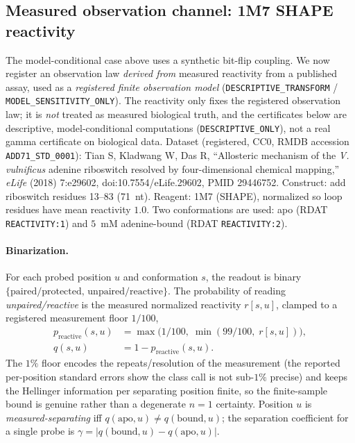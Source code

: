 \documentclass[11pt]{article}
\begin{document}
\subsection{Measured observation channel: 1M7 SHAPE reactivity}\label{sec:supp-measured}
The model-conditional case above uses a synthetic bit-flip coupling. We now register an observation law
\emph{derived from} measured reactivity from a published assay, used as a \emph{registered finite
observation model} (\texttt{DESCRIPTIVE\_TRANSFORM} / \texttt{MODEL\_SENSITIVITY\_ONLY}). The reactivity
only fixes the registered observation law; it is \emph{not} treated as measured biological truth, and the
certificates below are descriptive, model-conditional computations (\texttt{DESCRIPTIVE\_ONLY}), not a
real gamma certificate on biological data. Dataset (registered, CC0, RMDB accession
\texttt{ADD71\_STD\_0001}): Tian S, Kladwang W, Das R, ``Allosteric mechanism of the \emph{V.}
\emph{vulnificus} adenine riboswitch resolved by four-dimensional chemical mapping,'' \emph{eLife}
(2018) 7:e29602, doi:10.7554/eLife.29602, PMID 29446752. Construct: add riboswitch residues 13--83
(71~nt). Reagent: 1M7 (SHAPE), normalized so loop residues have mean reactivity $1.0$. Two conformations
are used: apo (RDAT \texttt{REACTIVITY:1}) and $5$~mM adenine-bound (RDAT \texttt{REACTIVITY:2}).

\paragraph{Binarization.}
For each probed position $u$ and conformation $s$, the readout is binary
$\{\text{paired/protected},\,\text{unpaired/reactive}\}$. The probability of reading
\emph{unpaired/reactive} is the measured normalized reactivity $r[s,u]$, clamped to a registered
measurement floor $1/100$,
\[
\begin{aligned}
p_{\mathrm{reactive}}(s,u)&=\max\bigl(1/100,\;\min(99/100,\;r[s,u])\bigr),\\
q(s,u)&=1-p_{\mathrm{reactive}}(s,u).
\end{aligned}
\]
The $1\%$ floor encodes the repeats/resolution of the measurement (the reported per-position standard
errors show the class call is not sub-$1\%$ precise) and keeps the Hellinger information per separating
position finite, so the finite-sample bound is genuine rather than a degenerate $n=1$ certainty.
Position $u$ is \emph{measured-separating} iff $q(\mathrm{apo},u)\neq q(\mathrm{bound},u)$; the
separation coefficient for a single probe is $\gamma=\left|q(\mathrm{bound},u)-q(\mathrm{apo},u)\right|$.
\end{document}
